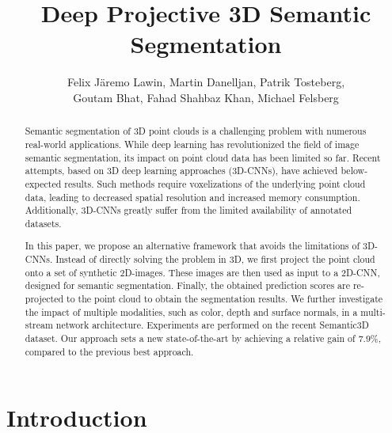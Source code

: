 \documentclass[runningheads,a4paper]{llncs}
\begin{document}
\mainmatter  

\title{Deep Projective 3D Semantic Segmentation}


\author{Felix J\"aremo Lawin, Martin Danelljan, Patrik Tosteberg, \\ Goutam Bhat, Fahad Shahbaz Khan, Michael Felsberg}




\maketitle


\begin{abstract}
Semantic segmentation of 3D point clouds is a challenging problem with numerous real-world applications. While deep learning has revolutionized the field of image semantic segmentation, its impact on point cloud data has been limited so far. Recent attempts, based on 3D deep learning approaches (3D-CNNs), have achieved below-expected results. Such methods require voxelizations of the underlying point cloud data, leading to decreased spatial resolution and increased memory consumption. Additionally, 3D-CNNs greatly suffer from the limited availability of annotated datasets.

In this paper, we propose an alternative framework that avoids the limitations of 3D-CNNs. Instead of directly solving the problem in 3D, we first project the point cloud onto a set of synthetic 2D-images. These images are then used as input to a 2D-CNN, designed for semantic segmentation. Finally, the obtained prediction scores are re-projected to the point cloud to obtain the segmentation results. We further investigate the impact of multiple modalities, such as color, depth and surface normals, in a multi-stream network architecture. Experiments are performed on the recent Semantic3D dataset. Our approach sets a new state-of-the-art by achieving a relative gain of $7.9 \%$, compared to the previous best approach.
\end{abstract}


\section{Introduction}
\end{document}
